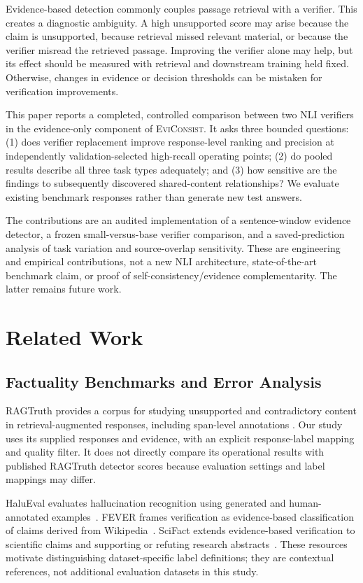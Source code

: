 \documentclass[conference,a4paper]{IEEEtran}
\newcommand{\method}{\textsc{EviConsist}}
\begin{document}
Evidence-based detection commonly couples passage retrieval with a verifier. This creates a diagnostic ambiguity. A high unsupported score may arise because the claim is unsupported, because retrieval missed relevant material, or because the verifier misread the retrieved passage. Improving the verifier alone may help, but its effect should be measured with retrieval and downstream training held fixed. Otherwise, changes in evidence or decision thresholds can be mistaken for verification improvements.

This paper reports a completed, controlled comparison between two NLI verifiers in the evidence-only component of \method. It asks three bounded questions: (1) does verifier replacement improve response-level ranking and precision at independently validation-selected high-recall operating points; (2) do pooled results describe all three task types adequately; and (3) how sensitive are the findings to subsequently discovered shared-content relationships? We evaluate existing benchmark responses rather than generate new test answers.

The contributions are an audited implementation of a sentence-window evidence detector, a frozen small-versus-base verifier comparison, and a saved-prediction analysis of task variation and source-overlap sensitivity. These are engineering and empirical contributions, not a new NLI architecture, state-of-the-art benchmark claim, or proof of self-consistency/evidence complementarity. The latter remains future work.

\section{Related Work}
\subsection{Factuality Benchmarks and Error Analysis}
RAGTruth provides a corpus for studying unsupported and contradictory content in retrieval-augmented responses, including span-level annotations \cite{ragtruth}. Our study uses its supplied responses and evidence, with an explicit response-label mapping and quality filter. It does not directly compare its operational results with published RAGTruth detector scores because evaluation settings and label mappings may differ.

HaluEval evaluates hallucination recognition using generated and human-annotated examples~\cite{halueval}.
FEVER frames verification as evidence-based classification of claims derived from Wikipedia~\cite{fever}.
SciFact extends evidence-based verification to scientific claims and supporting or refuting research abstracts~\cite{scifact}.
These resources motivate distinguishing dataset-specific label definitions; they are contextual references, not additional evaluation datasets in this study.
\end{document}
